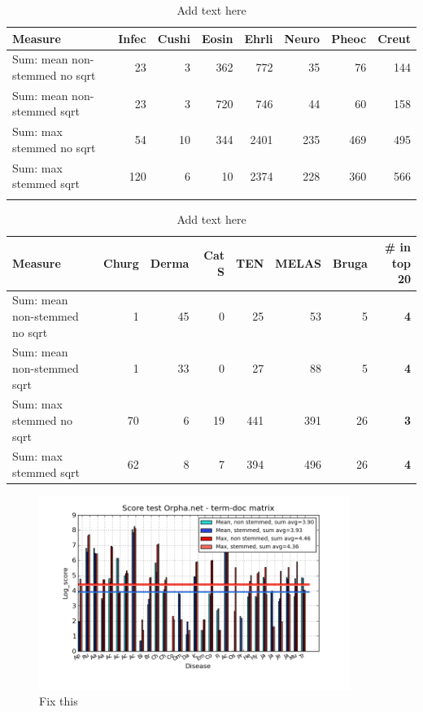 \begin{table}[H]
  \begin{tiny}
  \caption{Add text here}
  \label{testResult}
  \begin{tabular}{|l|r|r|r|r|r|r|r|}
    \hline
    Measure &Infec&Cushi&Eosin&Ehrli&Neuro&Pheoc&Creut \\
    \hline
    Sum: mean non-stemmed no sqrt &23&3&362&772&35&76&144 \\
    \hline
    Sum: mean non-stemmed sqrt &23&3&720&746&44&60&158 \\
    \hline
    Sum: max stemmed no sqrt &54&10&344&2401&235&469&495 \\
    \hline
    Sum: max stemmed sqrt &120&6&10&2374&228&360&566 \\
    \hline
  \multicolumn{8}{c}{} \\
  \end{tabular}
  \begin{tabular}{|l|r|r|r|r|r|r|r|}
    \hline
    Measure &Churg&Derma&Cat S&TEN&MELAS&Bruga& \scriptsize{\textbf{\# in top 20}} \\
    \hline
    Sum: mean non-stemmed no sqrt &1&45&0&25&53&5 &\scriptsize{\textbf{4}} \\
    \hline
    Sum: mean non-stemmed sqrt &1&33&0&27&88&5 &\scriptsize{\textbf{4}}\\
    \hline
    Sum: max stemmed no sqrt &70&6&19&441&391&26 & \scriptsize{\textbf{3}} \\
    \hline
    Sum: max stemmed sqrt &62&8&7&394&496&26 & \scriptsize{\textbf{4}} \\
    \hline
  \end{tabular}
  \end{tiny}
\end{table}

\begin{figure}[H]
        \begin{center}
          \includegraphics[width=0.9\textwidth]{barcharts/termDoc_orphan_hist_3000_ns_s_mea_max_sum.png}
        \end{center}
        \caption{Fix this}
        \label{termDoc_orphan_hist_3000_ns_s_mea_max_sum}
\end{figure} 

